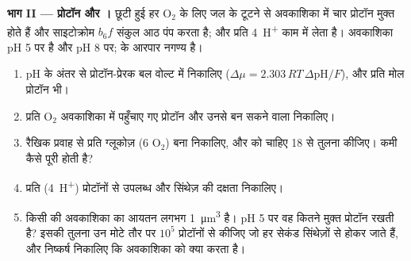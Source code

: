 \begin{problem}
\medskip
\noindent\textbf{भाग II --- प्रोटॉन और ।}
छूटी हुई हर $\mathrm{O_2}$ के लिए जल के टूटने से अवकाशिका में चार
प्रोटॉन मुक्त होते हैं और साइटोक्रोम $b_6f$ संकुल आठ पंप करता है;
और  प्रति  \qty{4}{H^+} काम में लेता है। अवकाशिका
pH 5 पर है और  pH 8 पर;  के आरपार 
नगण्य है।
\begin{enumerate}[resume]
  \item pH के अंतर से प्रोटॉन-प्रेरक बल वोल्ट में निकालिए
        ($\Delta\mu = 2.303\,RT\,\Delta\mathrm{pH}/F$), और प्रति मोल
        प्रोटॉन  भी।
  \item प्रति $\mathrm{O_2}$ अवकाशिका में पहुँचाए गए प्रोटॉन और उनसे बन
        सकने वाला  निकालिए।
  \item रैखिक प्रवाह से प्रति ग्लूकोज़ (6
        $\mathrm{O_2}$) बना  निकालिए, और  को चाहिए 18
        से तुलना कीजिए। कमी कैसे पूरी होती है?
  \item प्रति  (\qty{4}{H^+}) प्रोटॉनों से उपलब्ध  और
        सिंथेज़ की दक्षता निकालिए।
  \item किसी  की अवकाशिका का आयतन लगभग
        \qty{1}{\micro m^3} है। pH 5 पर वह कितने मुक्त प्रोटॉन रखती
        है? इसकी तुलना उन मोटे तौर पर $10^5$ प्रोटॉनों से कीजिए जो हर
        सेकंड सिंथेज़ों से होकर जाते हैं, और निष्कर्ष निकालिए कि
        अवकाशिका को क्या  करता है।
\end{enumerate}


\end{problem}

